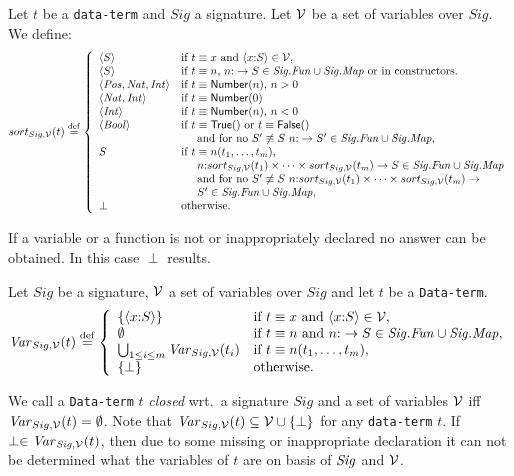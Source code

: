 \documentclass[fleqn,a4paper,dvips]{article}
\newcommand{\aterm}[1]{\mathsf{#1}}
\newcommand{\Sig}{\nm{Sig}}
\newcommand{\Fun}{\nm{Fun}}
\newcommand{\wor}{\stackrel{\mathrm{def}}{=}}
\newcommand{\NV}{{\cal V}}
\begin{document}
\begin{defn}
Let $t$ be a {\tt data-term} and $Sig$ a signature. Let $\NV$ be a set
of variables over $Sig$. We define:
\[sort_{Sig,\NV}(t)\wor\left\{
\begin{array}{ll}
\seq{S}&\mbox{if~}t\equiv x\mbox{ and }\langle x\ap S\rangle \in \NV,\\
\seq{S}&\mbox{if $t\equiv n$, $n\ap \rightarrow S\in
\Sig.\Fun\cup\Sig.\Map$ or in constructors.}\\
\seq{\nm{Pos},\nm{Nat},\nm{Int}}&\mbox{if $t\equiv\aterm{Number}(n)$, $n>0$}\\
\seq{\nm{Nat},\nm{Int}}&\mbox{if $t\equiv\aterm{Number}(0)$}\\
\seq{\nm{Int}}&\mbox{if $t\equiv\aterm{Number}(n)$, $n<0$}\\
\seq{\nm{Bool}}&\mbox{if $t\equiv\aterm{True}()$ or $t\equiv\aterm{False}()$}\\
&\hspace*{0.5cm}\mbox{and for no $S'\not\equiv S$}~n\ap \rightarrow
S'\in\Sig.\Fun\cup\Sig.\Map,\\
S&\mbox{if $t\equiv n(t_1,\ldots,t_m)$,}\\
&\mbox{$\hspace{0.5cm}n\ap sort_{Sig,\NV}(t_1)\times \cdots
\times sort_{Sig,\NV}(t_m)\rightarrow S \in \Sig.\Fun\cup\Sig.\Map$}\\
&\hspace{0.5cm}\mbox{and for
no}~S'\not\equiv S~n\ap sort_{Sig,\NV}(t_1)\times \cdots
\times sort_{Sig,\NV}(t_m)\rightarrow\\
&\hspace*{0.5cm}S' \in \Sig.\Fun\cup\Sig.\Map,\\
\perp&\mbox{otherwise}.
\end{array}\right.\]
\end{defn}
If a variable or a function is not or inappropriately declared
no answer can be obtained. In this case $\perp$ results.
\begin{defn}
Let $Sig$ be a signature, $\NV$ a set of
variables over $Sig$ and let $t$ be a {\tt Data-term}.
\[\Var_{Sig,\NV}(t)\wor
\left\{
\begin{array}{ll}
\{\langle x\ap S\rangle\}&\mbox{if }t\equiv x\mbox{ and }\langle
x\ap S\rangle\in \NV,\\
\emptyset&\mbox{if~}t\equiv n\mbox{ and }n\ap \rightarrow S\in
\Sig.\Fun\cup\Sig.\Map,\\
\bigcup_{1\leq i\leq m} \Var_{Sig,\NV}(t_i)&\mbox{if~}t\equiv
n(t_1,\ldots,t_m),\\
\{\perp\}&\mbox{otherwise}.
\end{array}\right.\]
\end{defn}
We call a {\tt Data-term} $t$ {\em closed} wrt.\ a signature
$Sig$ and a set of variables $\NV$ iff $\Var_{Sig,\NV}(t)=
\emptyset$. Note that $\Var_{Sig,\NV}(t)\subseteq\NV\cup\{\perp\}$
for any {\tt data-term} $t$. If $\perp\in \Var_{\Sig,\NV}(t)$, then
due  to some missing or inappropriate declaration
it can not be determined what the variables of $t$ are on basis of
$\Sig$ and $\NV$.
\end{document}
